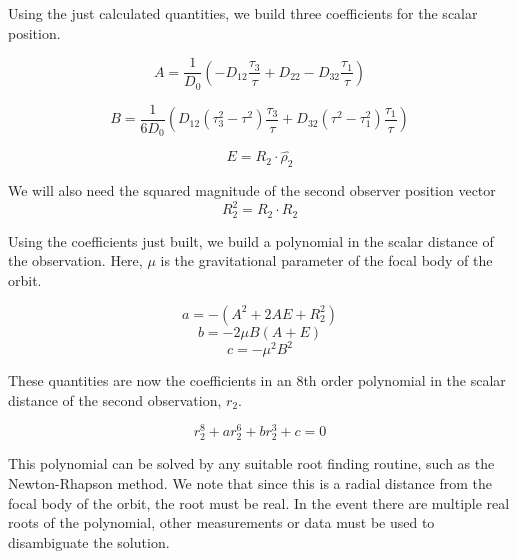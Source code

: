 \documentclass[11pt,twoside,letterpaper]{article}
\begin{document}
  Using the just calculated quantities, we build three coefficients
  for the scalar position.

  \begin{equation}
    A = \frac{1}{D_0}\left( -D_{12}\frac{\tau_3}{\tau} + D_{22} -D_{32}\frac{\tau_1}{\tau}\right)
  \end{equation}

  \begin{equation}
    B = \frac{1}{6D_0}\left( D_{12}\left(\tau_3^2 - \tau^2 \right)\frac{\tau_3}{\tau}
    + D_{32}\left(\tau^2 - \tau_1^2\right)\frac{\tau_1}{\tau} \right)
  \end{equation}

  \begin{equation}
    E = R_2\cdot\hat{\rho_2}
  \end{equation}

  We will also need the squared magnitude of the second observer position vector
  \begin{equation}
    R_2^2 = R_2\cdot R_2
  \end{equation}

  Using the coefficients just built, we build a polynomial in the
  scalar distance of the observation. Here, $\mu$ is the gravitational
  parameter of the focal body of the orbit. 

  \begin{equation}
    a = -\left(A^2 + 2AE + R_2^2 \right)
  \end{equation}
  \begin{equation}
    b = -2\mu B\left(A+E \right)
  \end{equation}
  \begin{equation}
    c = -{\mu}^2B^2
  \end{equation}

  These quantities are now the coefficients in an 8th order polynomial
  in the scalar distance of the second observation, $r_2$.

  \begin{equation}
    r_2^8 + ar_2^6 + br_2^3 + c = 0
  \end{equation}

  This polynomial can be solved by any suitable root finding routine,
  such as the Newton-Rhapson method. We note that since this is a
  radial distance from the focal body of the orbit, the root must be
  real. In the event there are multiple real roots of the polynomial,
  other measurements or data must be used to disambiguate the solution.
\end{document}
